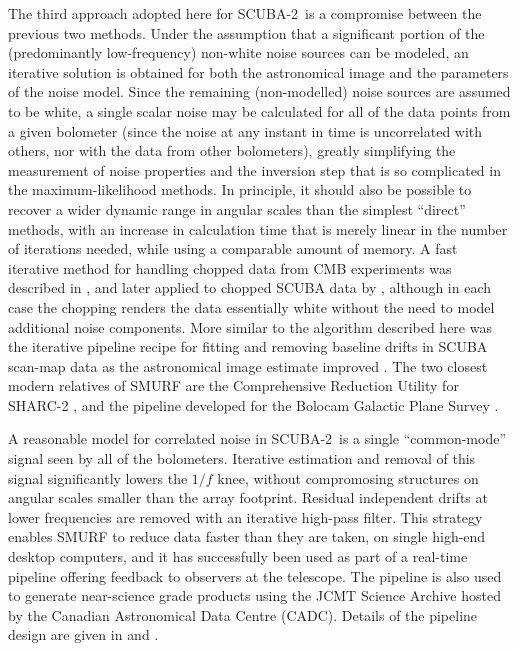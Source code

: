 \documentclass[useAMS,usenatbib,nofootinbib]{mn2e}
\newcommand{\scuba}{SCUBA-2}
\begin{document}

The third approach adopted here for \scuba\ is a compromise between
the previous two methods. Under the assumption that a significant
portion of the (predominantly low-frequency) non-white noise sources
can be modeled, an iterative solution is obtained for both the
astronomical image and the parameters of the noise model. Since the
remaining (non-modelled) noise sources are assumed to be white, a
single scalar noise may be calculated for all of the data points from
a given bolometer (since the noise at any instant in time is
uncorrelated with others, nor with the data from other bolometers),
greatly simplifying the measurement of noise properties and the
inversion step that is so complicated in the maximum-likelihood
methods. In principle, it should also be possible to recover a wider
dynamic range in angular scales than the simplest ``direct'' methods,
with an increase in calculation time that is merely linear in the
number of iterations needed, while using a comparable amount of
memory. A fast iterative method for handling chopped data from CMB
experiments was described in \citet{wright1996}, and later applied to
chopped SCUBA data by \citet{johnstone2000}, although in each case the
chopping renders the data essentially white without the need to model
additional noise components. More similar to the algorithm described
here was the iterative pipeline recipe for fitting and removing
baseline drifts in SCUBA scan-map data as the astronomical image
estimate improved \citep{1999ASPC..172..171J}. The two closest modern
relatives of SMURF are the Comprehensive Reduction Utility for SHARC-2
\citep[CRUSH,][]{kovacs2008}, and the pipeline developed for the
Bolocam Galactic Plane Survey \citep{aguirre2010}.

A reasonable model for correlated noise in \scuba\ is a single
``common-mode'' signal seen by all of the bolometers. Iterative
estimation and removal of this signal significantly lowers the $1/f$
knee, without compromosing structures on angular scales smaller than
the array footprint. Residual independent drifts at lower frequencies
are removed with an iterative high-pass filter. This strategy enables
SMURF to reduce data faster than they are taken, on single high-end
desktop computers, and it has successfully been used as part of a
real-time pipeline offering feedback to observers at the
telescope. The pipeline is also used to generate near-science grade
products using the JCMT Science Archive \citep{2011ASPC..442..203E}
hosted by the Canadian Astronomical Data Centre (CADC). Details of the
pipeline design are given in \citet{gibb2005} and
\citet{2008AN....329..295C}.
\end{document}
